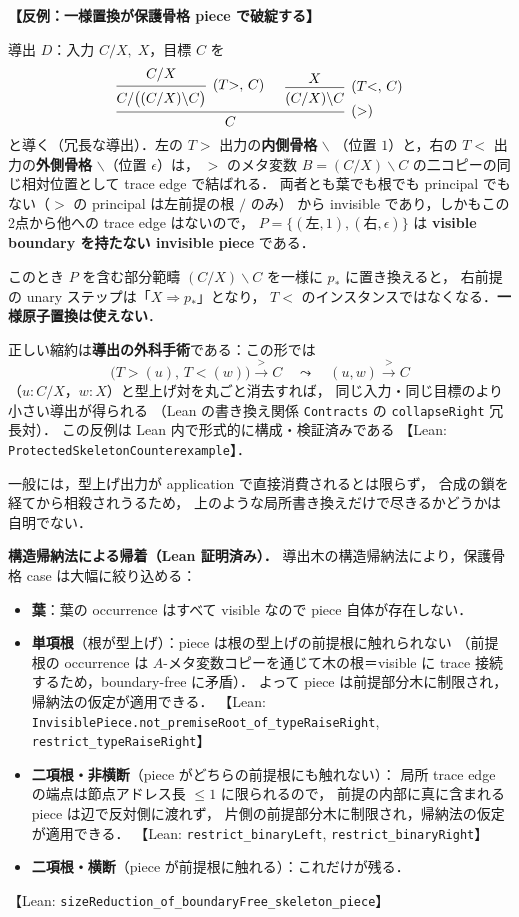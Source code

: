 \documentclass[paper=a4,fontsize=10pt,jafontscale=0.92]{jlreq}
\theoremstyle{plain}
\theoremstyle{definition}
\theoremstyle{remark}
\newcommand{\bs}{\backslash}
\newcommand{\lean}[1]{\texttt{#1}}
\begin{document}
\begin{verifybox}
\textbf{【反例：一様置換が保護骨格 piece で破綻する】}

導出 $D$：入力 $C/X,\;X$，目標 $C$ を
\[
\begin{prooftree}
  \hypo{C/X}
  \infer1[$(T{>},\,C)$]{C/\bigl((C/X)\bs C\bigr)}
  \hypo{X}
  \infer1[$(T{<},\,C)$]{(C/X)\bs C}
  \infer2[$(>)$]{C}
\end{prooftree}
\]
と導く（冗長な導出）．左の $T{>}$ 出力の\textbf{内側骨格} $\bs$
（位置 $1$）と，右の $T{<}$ 出力の\textbf{外側骨格} $\bs$（位置 $\epsilon$）は，
$>$ のメタ変数 $B = (C/X)\bs C$ の二コピーの同じ相対位置として
trace edge で結ばれる．
両者とも葉でも根でも principal でもない（$>$ の principal は左前提の根 $/$ のみ）
から invisible であり，しかもこの2点から他への trace edge はないので，
$P = \{(\text{左},1), (\text{右},\epsilon)\}$ は
\textbf{visible boundary を持たない invisible piece} である．

このとき $P$ を含む部分範疇 $(C/X)\bs C$ を一様に $p_\ast$ に置き換えると，
右前提の unary ステップは「$X \Rightarrow p_\ast$」となり，
$T{<}$ のインスタンスではなくなる．\textbf{一様原子置換は使えない}．

正しい縮約は\textbf{導出の外科手術}である：この形では
\[
  \bigl(T{>}(u) ,\, T{<}(w)\bigr) \xrightarrow{\;>\;} C
  \quad\leadsto\quad
  (u, w) \xrightarrow{\;>\;} C
\]
（$u : C/X$，$w : X$）と型上げ対を丸ごと消去すれば，
同じ入力・同じ目標のより小さい導出が得られる
（Lean の書き換え関係 \lean{Contracts} の \lean{collapseRight} 冗長対）．
この反例は Lean 内で形式的に構成・検証済みである
【Lean: \lean{ProtectedSkeletonCounterexample}】．
\end{verifybox}

一般には，型上げ出力が application で直接消費されるとは限らず，
合成の鎖を経てから相殺されうるため，
上のような局所書き換えだけで尽きるかどうかは自明でない．

\medskip
\noindent\textbf{構造帰納法による帰着（Lean 証明済み）．}
導出木の構造帰納法により，保護骨格 case は大幅に絞り込める：
\begin{itemize}
  \item \textbf{葉}：葉の occurrence はすべて visible なので piece 自体が存在しない．
  \item \textbf{単項根}（根が型上げ）：piece は根の型上げの前提根に触れられない
    （前提根の occurrence は $A$-メタ変数コピーを通じて木の根＝visible に
    trace 接続するため，boundary-free に矛盾）．
    よって piece は前提部分木に制限され，帰納法の仮定が適用できる．
    【Lean: \lean{InvisiblePiece.not\_premiseRoot\_of\_typeRaiseRight},
    \lean{restrict\_typeRaiseRight}】
  \item \textbf{二項根・非横断}（piece がどちらの前提根にも触れない）：
    局所 trace edge の端点は節点アドレス長 $\le 1$ に限られるので，
    前提の内部に真に含まれる piece は辺で反対側に渡れず，
    片側の前提部分木に制限され，帰納法の仮定が適用できる．
    【Lean: \lean{restrict\_binaryLeft}, \lean{restrict\_binaryRight}】
  \item \textbf{二項根・横断}（piece が前提根に触れる）：これだけが残る．
\end{itemize}
【Lean: \lean{sizeReduction\_of\_boundaryFree\_skeleton\_piece}】
\end{document}
